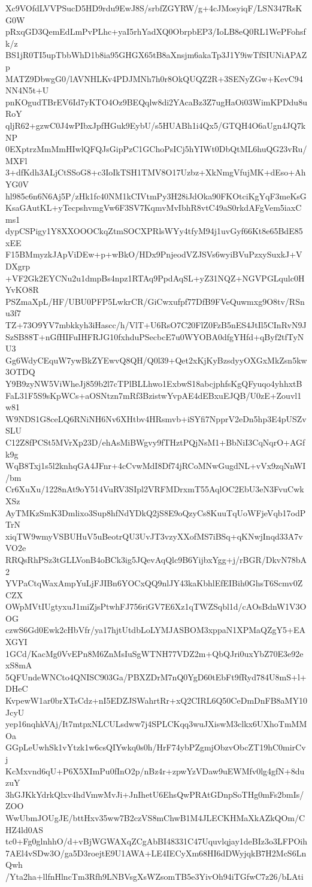 Xc9VOfdLVVPSucD5HD9rdu9EwJ8S/srbfZGYRW/g+4cJMosyiqF/LSN347RsKG0W
pRxqGD3QemEdLmPvPLhc+yaI5rhYadXQ0ObrpbEP3/IoLB8eQ0RL1WePFohsfk/z
BS1jR0TI5upTbbWhD1b8ia95GHGX65tB8aXnsjm6akaTp3J1Y9iwTfSIUNiAPAZp
MATZ9DbwgG0/lAVNHLKv4PDJMNh7h0r8OkQUQZ2R+3SENyZGw+KevC94NN4N5t+U
pnKOgudTBrEV6Id7yKTO4Oz9BEQqlw8di2YAcaBz3Z7ugHaOi03WimKPDdu8uRoY
qljR62+gzwC0J4wPIbxJpfHGuk9EybU/s5HUABh1i4Qx5/GTQH4O6aUgn4JQ7kNP
0EXptrzMmMmHIwlQFQJsGipPzC1GChoPsICj5hYIWt0DbQtML6huQG23vRu/MXFl
3+dfKdh3ALjCtSSoG8+c3IoIkTSH1TMV8O17Uzbz+XkNmgVfujMK+dEso+AhYG0V
hl985c6n6N6Aj5P/zHk1fc40NM1kCIVtmPy3H28iJdOka90FKOtciKgYqF3meKsG
KsaGAutKL+yTecpshvmgVw6F3SV7KqmvMvIbhR8vtC49aS0rkdAFgVem5iaxCms1
dypCSPigy1Y8XXOOOCkqZtmSOCXPRlsWYy4tfyM94j1uvGyf66Kt8e65BdE85xEE
F15BMmyzkJApViDEw+p+wBkO/HDx9PnjeodVZJSVs6wyiBVuPzxySuxkJ+VDXgrp
+VF2Gk2EYCNu2u1dmpBs4npz1RTAq9PpdAqSL+yZ31NQZ+NGVPGLqulc0HYvKO8R
PSZmaXpL/HF/UBU0PFP5LwkrCR/GiCwxufpf77DfB9FVeQuwmxg9O8tv/RSnu3f7
TZ+73O9YV7mbkkyh3iHascc/h/VlT+U6RsO7C20FlZ0FzB5nES4JtIl5CInRvN9J
SzSB88T+nGfHIFuIHFRJG10fxhduPSecbcE7u0WYOBA0dfgYHfd+qByf2tfTyNU3
Gg6WdyCEquW7ywBkZYEwvQ8QH/Q0l39+Qet2xKjKyBzsdyyOXGxMkZsn5kw3OTDQ
Y9B9zyNW5ViWheJj859b2l7cTPlBLLhwo1ExbwS18abcjphfsKgQFyuqo4yhhxtB
FaL31F5S9sKpWCs+aOSNtzn7mRf3BzistwYvpAE4dEBxuEJQB/U0zE+Zouvl1w81
W9NDS1G8ceLQ6RNiNH6Nv6XHtbv4HRsmvb+iSYfi7NpprV2eDn5hp3E4pUSZvSLU
C12Z8fPCSt5MVrXp23D/ehAsMiBWgvy9fTHztPQjNsM1+BbNiI3CqNqrO+AGfk9g
WqB8Txj1s5l2knhqGA4JFnr+4cCvwMdI8Df74jRCoMNwGugdNL+vVx9zqNnWI/bm
Cr6XuXu/1228nAt9oY514VuRV3SIpl2VRFMDrxmT55AqlOC2EbU3eN3FvuCwkXSz
AyTMKzSmK3Dmlixo3Sup8hfNdYDkQ2jS8E9oQzyCs8KuuTqUoWFjeVqb17odPTrN
xiqTW9wmyVSBUHuV5uBeotrQU3UvJT3vzyXXofMS7iBSq+qKNwjInqd33A7vVO2e
RRQsRhPSz3tGLLVonB4oBCk3ig5JQevAqQlc9B6YijbxYgg+j/rBGR/DkvN78bA2
YVPaCtqWaxAmpYuLjFJIBn6YOCxQQ9nlJY43kaKbhlEfEIBih0GhsT6Scmv0ZCZX
OWpMVtIUgtyxuJ1miZjsPtwhFJ756riGV7E6Xz1qTWZSqbl1d/cAOsBdnW1V3OOG
czwS6Gd0Ewk2cHbVfr/ya17hjtUtdbLoLYMJASBOM3xppaN1XPMaQZgY5+EAXGYI
1GCd/KacMg0VvEPn8M6ZnMsIuSgWTNH77VDZ2m+QbQJri0uxYbZ70E3e92exS8mA
5QFUndeWNCto4QNISC903Ga/PBXZDrM7nQ0YgD60tEbFt9fRyd784U8mS+l+DHeC
KvpewW1ar0brXTsCdz+nI5EDZJSWahrtRr+xQ2CIRL6Q50CeDmDnFB8aMY10JcyU
yep16nqhkVAj/It7mtpxNLCULsdww7j4SPLCKqq3wuJXiswM3clkx6UXhoTmMMOa
GGpLeUwhSk1vYtzk1w6csQIYwkq0s0h/HrF74ybPZgmjObzvObcZT19hC0mirCvj
KcMxvnd6qU+P6X5XImPu0fInO2p/nBz4r+zpwYzVDaw9uEWMfv0lg4gfN+8duzuY
3hGJKkYdrkQlxv4hdVmwMvJi+JnIhetU6EhsQwPRAtGDnpSoTHg0mFs2bmIs/ZOO
WwUbmJOUgJE/bttHxv35ww7B2czVS8mChwB1M4JLECKHMaXkAZkQOm/CHZ4ld0AS
tc0+Fg0glnhhO/d+vBjWGWAXqZCgAbBI48331C47Uquvlqjay1deBIz3o3LFPOih
7AEl4vSDw3O/ga5D3roejtE9U1AWA+LE4IECyXm68HI6dDWyjqkB7H2McS6LnQwh
/Yta2ha+llfnHlncTm3Rfh9LNBVsgXsWZsomTB5e3YivOh94iTGfwC7z26/bLAti
